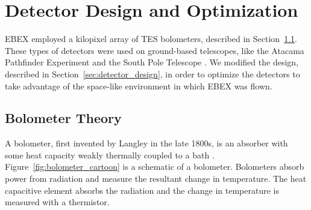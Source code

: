 \chapter{Detector Design and Optimization}
\label{sec:optimization_chapter}

\ac{EBEX} employed a kilopixel array of \ac{TES} bolometers, described in Section~\ref{sec:tes_bolometer}. 
These types of detectors were used on ground-based telescopes, like the Atacama Pathfinder Experiment and the South Pole Telescope \cite{Ruhl2004} \cite{Schwan2011}. 
We modified the design, described in Section~\ref{sec:detector_design}, in order to optimize the detectors to take advantage of the space-like environment in which \ac{EBEX} was flown.


\section{Bolometer Theory}
\label{sec:tes_bolometer}




A bolometer, first invented by Langley in the late 1800s, is an absorber with some heat capacity weakly thermally coupled to a bath \cite{langley}.
Figure~\ref{fig:bolometer_cartoon} is a schematic of a bolometer. 
Bolometers absorb power from radiation and measure the resultant change in temperature. 
The heat capacitive element absorbs the radiation and the change in temperature is measured with a thermistor. 

